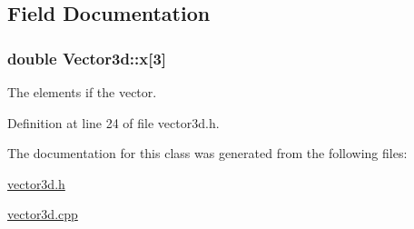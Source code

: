 \subsection{\-Field \-Documentation}
\hypertarget{classVector3d_ae5e82a2be7cc2e195e56875a5befe509}{
\subsubsection[{x}]{\setlength{\rightskip}{0pt plus 5cm}double {\bf \-Vector3d\-::x}\mbox{[}3\mbox{]}}}\label{df/dd0/classVector3d_ae5e82a2be7cc2e195e56875a5befe509}
\-The elements if the vector. 

\-Definition at line 24 of file vector3d.\-h.



\-The documentation for this class was generated from the following files\-:\begin{DoxyCompactItemize}
\item 
\hyperlink{vector3d_8h}{vector3d.\-h}\item 
\hyperlink{vector3d_8cpp}{vector3d.\-cpp}\end{DoxyCompactItemize}
